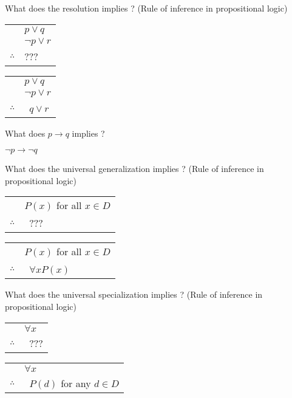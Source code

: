 \documentclass[12pt]{article}
\newcommand*{\xfield}[1]{\begin{mdframed}\centering #1\end{mdframed}\bigskip}
\newenvironment{note}{}{}
\begin{document}
\begin{note}
    \xfield{
        What does the resolution implies ? (Rule of inference in propositional logic) \begin{tabular}{c@{\,}l@{}}
        & $p \vee q$ \\
        & $\neg p \vee r$ \\
        \cline{2-2}    $\therefore$  & ???
        \end{tabular}
        }
    \xfield{
        \begin{tabular}{c@{\,}l@{}}
        & $p \vee q$ \\
        & $\neg p \vee r$ \\
        \cline{2-2}    $\therefore$         & \ $q \vee r$ \\  \end{tabular}
    }
\end{note}

\begin{note}
    \xfield{What does $p \to q$ implies ?}
    \xfield{$\neg p \to \neg q$}
\end{note}

\begin{note}
    \xfield{
        What does the universal generalization implies ? (Rule of inference in propositional logic) \begin{tabular}{c@{\,}l@{}}
        & $P(x)$ for all $x \in D$ \\\cline{2-2}    $\therefore$         & \ ??? \\  \end{tabular}
    }
    \xfield{ \begin{tabular}{c@{\,}l@{}}& $P(x)$ for all $x \in D$ \\\cline{2-2}    $\therefore$         & \ $\forall x P(x)$ \\  \end{tabular}}
\end{note}

\begin{note}
    \xfield{
        What does the universal specialization implies ? (Rule of inference in propositional logic) \begin{tabular}{c@{\,}l@{}}
        & $\forall x$ \\\cline{2-2}    $\therefore$         & \ ??? \\  \end{tabular}
    }
    \xfield{ \begin{tabular}{c@{\,}l@{}}& $\forall x$ \\\cline{2-2}    $\therefore$         & \ $P(d)$ for any $d \in D$ \\  \end{tabular}}
\end{note}
\end{document}
